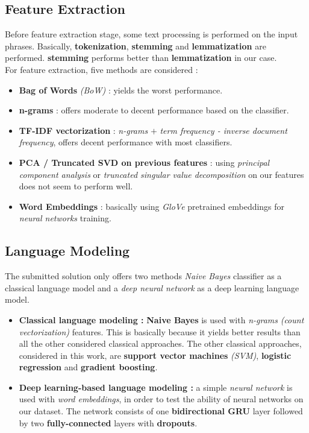 \documentclass[letterpaper, 10 pt, conference]{ieeeconf}  %
\begin{document}
\subsection{Feature Extraction}
Before feature extraction stage, some text processing is performed on the input phrases. Basically, \textbf{tokenization}, \textbf{stemming} and \textbf{lemmatization} are performed. \textbf{stemming} performs better than \textbf{lemmatization} in our case. \\
For feature extraction, five methods are considered :
\begin{itemize}
    \item \textbf{Bag of Words} \emph{(BoW)} : yields the worst performance.
    \item \textbf{n-grams} : offers moderate to decent performance based on the classifier.
    \item \textbf{TF-IDF vectorization} : \emph{n-grams} $+$ \emph{term frequency - inverse document frequency}, offers decent performance with most classifiers.
    \item \textbf{PCA / Truncated SVD on previous features} : using \emph{principal component analysis} or \emph{truncated singular value decomposition} on our features does not seem to perform well.
    \item \textbf{Word Embeddings} : basically using \emph{GloVe} pretrained embeddings for \emph{neural networks} training.
\end{itemize}

\subsection{Language Modeling}
The submitted solution only offers two methods \emph{Naive Bayes} classifier as a classical language model and a \emph{deep neural network} as a deep learning language model.
\begin{itemize}
    \item \textbf{Classical language modeling :} \textbf{Naive Bayes} is used with \emph{n-grams} \emph{(count vectorization)} features. This is basically because it yields better results than all the other considered classical approaches. The other classical approaches, considered in this work, are \textbf{support vector machines} \emph{(SVM)}, \textbf{logistic regression} and \textbf{gradient boosting}.
    \item \textbf{Deep learning-based language modeling :} a simple \emph{neural network} is used with \emph{word embeddings}, in order to test the ability of neural networks on our dataset. The network consists of one \textbf{bidirectional GRU} layer followed by two \textbf{fully-connected} layers with \textbf{dropouts}. 
\end{itemize}
\end{document}
